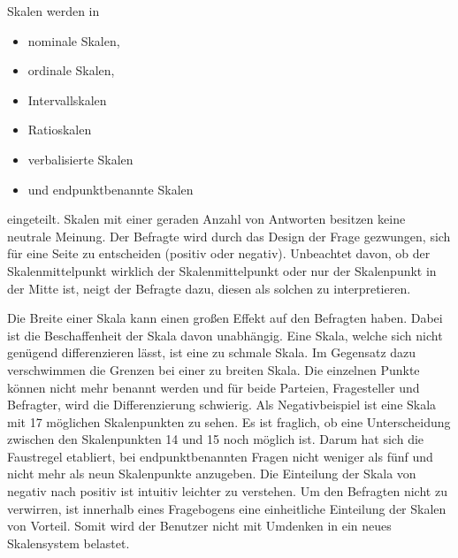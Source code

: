 Skalen werden in 
\begin{itemize}
	\item nominale Skalen,
	\item ordinale Skalen,
	\item Intervallskalen
	\item Ratioskalen
	\item verbalisierte Skalen
	\item und endpunktbenannte Skalen
\end{itemize}

eingeteilt.\autocite[Vgl.][S. 71]{2014Fragebogen}
Skalen mit einer geraden Anzahl von Antworten besitzen keine neutrale Meinung. 
Der Befragte wird durch das Design der Frage gezwungen, sich für eine Seite zu entscheiden (positiv oder negativ).
Unbeachtet davon, ob der Skalenmittelpunkt wirklich der Skalenmittelpunkt oder nur der Skalenpunkt in der Mitte ist, neigt der Befragte dazu, diesen als solchen zu interpretieren.\autocite[Vgl.][S. 83]{2014Fragebogen}%

Die Breite einer Skala kann einen großen Effekt auf den Befragten haben.
Dabei ist die Beschaffenheit der Skala davon unabhängig.
Eine Skala, welche sich nicht genügend differenzieren lässt, ist eine zu schmale Skala.
Im Gegensatz dazu verschwimmen die Grenzen bei einer zu breiten Skala. %
Die einzelnen Punkte können nicht mehr benannt werden und für beide Parteien, Fragesteller und Befragter, wird die Differenzierung schwierig. \newline
Als Negativbeispiel ist eine Skala mit 17 möglichen Skalenpunkten zu sehen.
Es ist fraglich, ob eine Unterscheidung zwischen den Skalenpunkten 14 und 15 noch möglich ist.
Darum hat sich die Faustregel etabliert, bei endpunktbenannten Fragen nicht weniger als fünf und nicht mehr als neun Skalenpunkte anzugeben.\autocite[Vgl.][S. 87]{2014Fragebogen} %
Die Einteilung der Skala von negativ nach positiv ist intuitiv leichter zu verstehen.
Um den Befragten nicht zu verwirren, ist innerhalb eines Fragebogens eine einheitliche Einteilung der Skalen von Vorteil.
Somit wird der Benutzer nicht mit Umdenken in ein neues Skalensystem belastet.\autocite[Vgl.][S. 89 f]{2014Fragebogen} %

